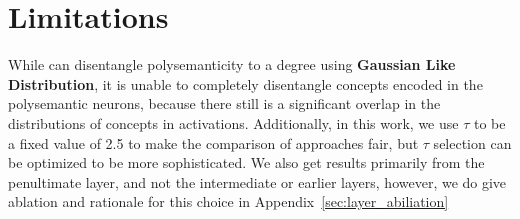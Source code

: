 











\section{Limitations}
While \ourframework{} can disentangle polysemanticity to a degree using \textbf{Gaussian Like Distribution}, it is unable to completely disentangle concepts encoded in the polysemantic neurons, because there still is a significant overlap in the distributions of concepts in activations. Additionally, in this work, we use $\tau$ to be a fixed value of 2.5 to make the comparison of approaches fair, but $\tau$ selection can be optimized to be more sophisticated. We also get results primarily from the penultimate layer, and not the intermediate or earlier layers, however, we do give ablation and rationale for this choice in Appendix~\ref{sec:layer_abiliation}


